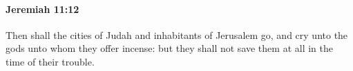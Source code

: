 
		\paragraph{Jeremiah 11:12} %
			\label{JEREMIAH-11-12}

			Then shall the cities of Judah and inhabitants of Jerusalem go, and cry unto the gods unto whom they offer incense: but they shall not save them at all in the time of their trouble.


